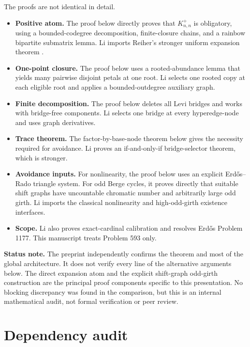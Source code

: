 \documentclass[11pt]{article}
\newcommand{\tightlist}{\setlength{\itemsep}{0pt}\setlength{\parskip}{0pt}}
\renewenvironment{quote}
  {\begin{tcolorbox}[breakable,colback=SlateLight,colframe=Slate!65,boxrule=0.5pt,arc=1mm,left=2mm,right=2mm,top=1.2mm,bottom=1.2mm]}
  {\end{tcolorbox}}
\begin{document}
The proofs are not identical in detail.

\begin{itemize}
\tightlist
\item
  \textbf{Positive atom.} The proof below directly proves that \(K_{n,n}^{+}\) is obligatory, using a bounded-codegree decomposition, finite-closure chains, and a rainbow bipartite submatrix lemma. Li imports Reiher's stronger uniform expansion theorem \autocite{reiher2024}.
\item
  \textbf{One-point closure.} The proof below uses a rooted-abundance lemma that yields many pairwise disjoint petals at one root. Li selects one rooted copy at each eligible root and applies a bounded-outdegree auxiliary graph.
\item
  \textbf{Finite decomposition.} The proof below deletes all Levi bridges and works with bridge-free components. Li selects one bridge at every hyperedge-node and uses graph derivatives.
\item
  \textbf{Trace theorem.} The factor-by-base-node theorem below gives the necessity required for avoidance. Li proves an if-and-only-if bridge-selector theorem, which is stronger.
\item
  \textbf{Avoidance inputs.} For nonlinearity, the proof below uses an explicit Erdős--Rado triangle system. For odd Berge cycles, it proves directly that suitable shift graphs have uncountable chromatic number and arbitrarily large odd girth. Li imports the classical nonlinearity and high-odd-girth existence interfaces.
\item
  \textbf{Scope.} Li also proves exact-cardinal calibration and resolves Erdős Problem 1177. This manuscript treats Problem 593 only.
\end{itemize}

\begin{quote}
\textbf{Status note.} The preprint independently confirms the theorem and most of the global architecture. It does not verify every line of the alternative arguments below. The direct expansion atom and the explicit shift-graph odd-girth construction are the principal proof components specific to this presentation. No blocking discrepancy was found in the comparison, but this is an internal mathematical audit, not formal verification or peer review.
\end{quote}

\section{Dependency audit}\label{dependency-audit}
\end{document}
